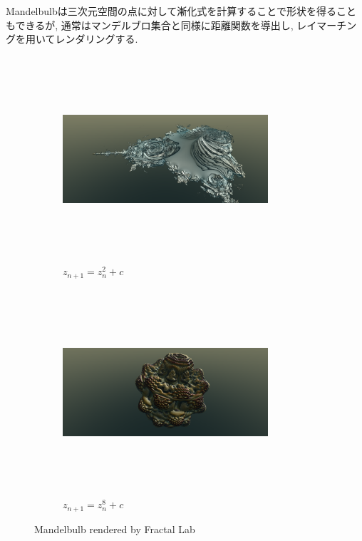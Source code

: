 Mandelbulbは三次元空間の点に対して漸化式を計算することで形状を得ることもできるが, 通常はマンデルブロ集合と同様に距離関数を導出し, レイマーチングを用いてレンダリングする.

\begin{figure}[h!tbp]
 \begin{subfigure}{0.49\hsize}
   \begin{center}
    \includegraphics[width=3in, height=3in, keepaspectratio]{../img/fractal/mandelbulb2.pdf}
    \caption{$z_{n + 1} = z_n^2 + c$}
    \label{fig:mandelbulb2}
   \end{center}
 \end{subfigure}
 \hspace*{\fill}
 \begin{subfigure}{0.49\hsize}
   \begin{center}
    \includegraphics[width=3in, height=3in, keepaspectratio]{../img/fractal/mandelbulb8.pdf}
    \caption{$z_{n+1} = z_n^8 + c$}
    \label{fig:mandelbulb8}
   \end{center}
 \end{subfigure}
 \caption{Mandelbulb rendered by Fractal Lab}
\end{figure}

